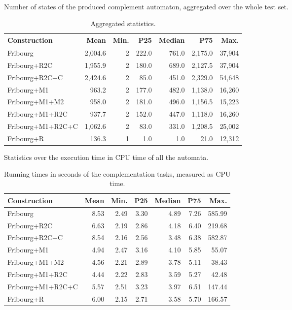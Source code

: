 Number of states of the produced complement automaton, aggregated over the whole test set.

\begin{table}[ht]
\centering
\begin{tabular}{lrrrrrr}
  \hline
Construction & Mean & Min. & P25 & Median & P75 & Max. \\ 
  \hline
Fribourg & 2,004.6 & 2 & 222.0 & 761.0 & 2,175.0 & 37,904 \\ 
  Fribourg+R2C & 1,955.9 & 2 & 180.0 & 689.0 & 2,127.5 & 37,904 \\ 
  Fribourg+R2C+C & 2,424.6 & 2 & 85.0 & 451.0 & 2,329.0 & 54,648 \\ 
  Fribourg+M1 & 963.2 & 2 & 177.0 & 482.0 & 1,138.0 & 16,260 \\ 
  Fribourg+M1+M2 & 958.0 & 2 & 181.0 & 496.0 & 1,156.5 & 15,223 \\ 
  Fribourg+M1+R2C & 937.7 & 2 & 152.0 & 447.0 & 1,118.0 & 16,260 \\ 
  Fribourg+M1+R2C+C & 1,062.6 & 2 & 83.0 & 331.0 & 1,208.5 & 25,002 \\ 
  Fribourg+R & 136.3 & 1 & 1.0 & 1.0 & 21.0 & 12,312 \\ 
   \hline
\end{tabular}
\caption{Aggregated statistics.}
\end{table}

Statistics over the execution time in CPU time of all the automata.

\begin{table}[ht]
\centering
\begin{tabular}{lrrrrrr}
  \hline
Construction & Mean & Min. & P25 & Median & P75 & Max. \\ 
  \hline
Fribourg & 8.53 & 2.49 & 3.30 & 4.89 & 7.26 & 585.99 \\ 
  Fribourg+R2C & 6.63 & 2.19 & 2.86 & 4.18 & 6.40 & 219.68 \\ 
  Fribourg+R2C+C & 8.54 & 2.16 & 2.56 & 3.48 & 6.38 & 582.87 \\ 
  Fribourg+M1 & 4.94 & 2.47 & 3.16 & 4.10 & 5.85 & 55.07 \\ 
  Fribourg+M1+M2 & 4.56 & 2.21 & 2.89 & 3.78 & 5.11 & 38.43 \\ 
  Fribourg+M1+R2C & 4.44 & 2.22 & 2.83 & 3.59 & 5.27 & 42.48 \\ 
  Fribourg+M1+R2C+C & 5.57 & 2.51 & 3.23 & 3.97 & 6.51 & 147.44 \\ 
  Fribourg+R & 6.00 & 2.15 & 2.71 & 3.58 & 5.70 & 166.57 \\ 
   \hline
\end{tabular}
\caption{Running times in seconds of the complementation tasks, measured as CPU time.}
\end{table}

